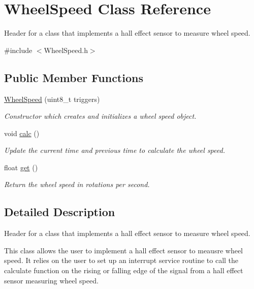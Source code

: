 \hypertarget{class_wheel_speed}{}\section{Wheel\+Speed Class Reference}
\label{class_wheel_speed}


Header for a class that implements a hall effect sensor to measure wheel speed.  




{\ttfamily \#include $<$Wheel\+Speed.\+h$>$}

\subsection*{Public Member Functions}
\begin{DoxyCompactItemize}
\item 
\mbox{\hyperlink{class_wheel_speed_ab7de12fcc47b53a5b046905f1efdf4cf}{Wheel\+Speed}} (uint8\+\_\+t triggers)
\begin{DoxyCompactList}\small\item\em Constructor which creates and initializes a wheel speed object. \end{DoxyCompactList}\item 
void \mbox{\hyperlink{class_wheel_speed_acb8fa757d8e929af83da7c5842315118}{calc}} ()
\begin{DoxyCompactList}\small\item\em Update the current time and previous time to calculate the wheel speed. \end{DoxyCompactList}\item 
float \mbox{\hyperlink{class_wheel_speed_a1b830e36d556de4f9aa6c2a1e4100fd8}{get}} ()
\begin{DoxyCompactList}\small\item\em Return the wheel speed in rotations per second. \end{DoxyCompactList}\end{DoxyCompactItemize}


\subsection{Detailed Description}
Header for a class that implements a hall effect sensor to measure wheel speed. 

This class allows the user to implement a hall effect sensor to meausre wheel speed. It relies on the user to set up an interrupt service routine to call the calculate function on the rising or falling edge of the signal from a hall effect sensor measuring wheel speed. 


